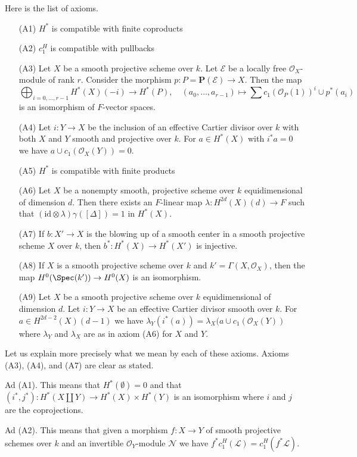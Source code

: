 \medskip\noindent
Here is the list of axioms.
\begin{enumerate}
\item[(A1)] $H^*$ is compatible with finite coproducts
\item[(A2)] $c_1^H$ is compatible with pullbacks
\item[(A3)] Let $X$ be a smooth projective scheme over $k$.
Let $\mathcal{E}$ be a locally free $\mathcal{O}_X$-module of rank $r$.
Consider the morphism $p : P = \mathbf{P}(\mathcal{E}) \to X$.
Then the map
$$
\bigoplus\nolimits_{i = 0, \ldots, r - 1} H^*(X)(-i)
\longrightarrow H^*(P),\quad
(a_0, \ldots, a_{r - 1}) \longmapsto
\sum c_1(\mathcal{O}_P(1))^i \cup p^*(a_i)
$$
is an isomorphism of $F$-vector spaces.
\item[(A4)] Let $i : Y \to X$ be the inclusion of an effective
Cartier divisor over $k$ with both $X$ and $Y$ smooth and projective
over $k$. For $a \in H^*(X)$ with
$i^*a = 0$ we have $a \cup c_1(\mathcal{O}_X(Y)) = 0$.
\item[(A5)] $H^*$ is compatible with finite products
\item[(A6)] Let $X$ be a nonempty smooth, projective scheme over $k$
equidimensional of dimension $d$. Then there exists an
$F$-linear map $\lambda : H^{2d}(X)(d) \to F$ such that
$(\text{id} \otimes \lambda) \gamma([\Delta]) =  1$ in $H^*(X)$.
\item[(A7)] If $b : X' \to X$ is the blowing up of a smooth
center in a smooth projective scheme $X$ over $k$, then
$b^* : H^*(X) \to H^*(X')$ is injective.
\item[(A8)] If $X$ is a smooth projective scheme over $k$ and
$k' = \Gamma(X, \mathcal{O}_X)$, then the map $H^0(\Spec(k')) \to H^0(X)$
is an isomorphism.
\item[(A9)] Let $X$ be a smooth projective scheme over $k$ equidimensional
of dimension $d$. Let $i : Y \to X$ be an effective Cartier divisor smooth
over $k$. For $a \in H^{2d - 2}(X)(d - 1)$ we have
$\lambda_Y(i^*(a)) = \lambda_X(a \cup c_1(\mathcal{O}_X(Y))$ where
$\lambda_Y$ and $\lambda_X$ are as in axiom (A6) for $X$ and $Y$.
\end{enumerate}
Let us explain more precisely what we mean by each of these axioms.
Axioms (A3), (A4), and (A7) are clear as stated.

\medskip\noindent
Ad (A1). This means that $H^*(\emptyset) = 0$ and that
$(i^*, j^*) : H^*(X \amalg Y) \to H^*(X) \times H^*(Y)$
is an isomorphism where $i$ and $j$ are the coprojections.

\medskip\noindent
Ad (A2). This means that given a morphism $f : X \to Y$ of smooth projective
schemes over $k$ and an invertible $\mathcal{O}_Y$-module $\mathcal{N}$
we have $f^*c_1^H(\mathcal{L}) = c_1^H(f^*\mathcal{L})$.

